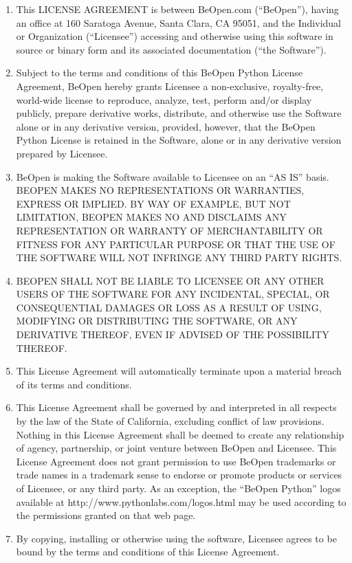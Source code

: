 \begin{enumerate}
\item
This LICENSE AGREEMENT is between BeOpen.com (``BeOpen''), having an
office at 160 Saratoga Avenue, Santa Clara, CA 95051, and the
Individual or Organization (``Licensee'') accessing and otherwise
using this software in source or binary form and its associated
documentation (``the Software'').

\item
Subject to the terms and conditions of this BeOpen Python License
Agreement, BeOpen hereby grants Licensee a non-exclusive,
royalty-free, world-wide license to reproduce, analyze, test, perform
and/or display publicly, prepare derivative works, distribute, and
otherwise use the Software alone or in any derivative version,
provided, however, that the BeOpen Python License is retained in the
Software, alone or in any derivative version prepared by Licensee.

\item
BeOpen is making the Software available to Licensee on an ``AS IS''
basis.  BEOPEN MAKES NO REPRESENTATIONS OR WARRANTIES, EXPRESS OR
IMPLIED.  BY WAY OF EXAMPLE, BUT NOT LIMITATION, BEOPEN MAKES NO AND
DISCLAIMS ANY REPRESENTATION OR WARRANTY OF MERCHANTABILITY OR FITNESS
FOR ANY PARTICULAR PURPOSE OR THAT THE USE OF THE SOFTWARE WILL NOT
INFRINGE ANY THIRD PARTY RIGHTS.

\item
BEOPEN SHALL NOT BE LIABLE TO LICENSEE OR ANY OTHER USERS OF THE
SOFTWARE FOR ANY INCIDENTAL, SPECIAL, OR CONSEQUENTIAL DAMAGES OR LOSS
AS A RESULT OF USING, MODIFYING OR DISTRIBUTING THE SOFTWARE, OR ANY
DERIVATIVE THEREOF, EVEN IF ADVISED OF THE POSSIBILITY THEREOF.

\item
This License Agreement will automatically terminate upon a material
breach of its terms and conditions.

\item
This License Agreement shall be governed by and interpreted in all
respects by the law of the State of California, excluding conflict of
law provisions.  Nothing in this License Agreement shall be deemed to
create any relationship of agency, partnership, or joint venture
between BeOpen and Licensee.  This License Agreement does not grant
permission to use BeOpen trademarks or trade names in a trademark
sense to endorse or promote products or services of Licensee, or any
third party.  As an exception, the ``BeOpen Python'' logos available
at http://www.pythonlabs.com/logos.html may be used according to the
permissions granted on that web page.

\item
By copying, installing or otherwise using the software, Licensee
agrees to be bound by the terms and conditions of this License
Agreement.
\end{enumerate}


